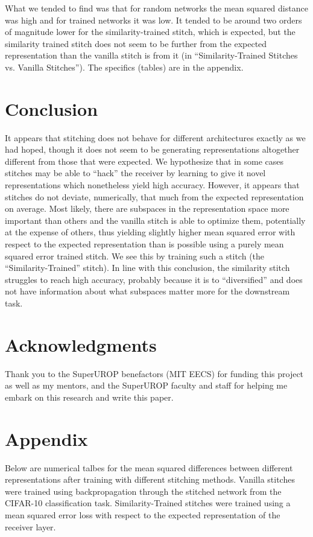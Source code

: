 \documentclass{article} %
\begin{document}
What we tended to find was that for random networks the mean squared distance was high and for trained networks it was
low. It tended to be around two orders of magnitude lower for the similarity-trained stitch, which is expected, but the
similarity trained stitch does not seem to be further from the expected representation than the vanilla stitch is from it
(in ``Similarity-Trained Stitches vs. Vanilla Stitches''). The specifics (tables) are in the appendix.
   
\section{Conclusion}
\label{Conclusion}
It appears that stitching does not behave for different architectures exactly as we had hoped, though it does not seem
to be generating representations altogether different from those that were expected. We hypothesize that in some cases
stitches may be able to ``hack'' the receiver by learning to give it novel representations which nonetheless yield high
accuracy. However, it appears that stitches do not deviate, numerically, that much from the expected representation on
average. Most likely, there are subspaces in the representation space more important than others and the vanilla stitch
is able to optimize them, potentially at the expense of others, thus yielding slightly higher mean squared error with
respect to the expected representation than is possible using a purely mean squared error trained stitch. We see this
by training such a stitch (the ``Similarity-Trained'' stitch). In line with this conclusion, the similarity stitch struggles
to reach high accuracy, probably because it is to ``diversified'' and does not have information about what subspaces
matter more for the downstream task.

\section*{Acknowledgments}
\label{Acknowledgments}
Thank you to the SuperUROP benefactors (MIT EECS) for funding this project as well as my mentors, and the
SuperUROP faculty and staff for helping me embark on this research and write this paper.
\newpage


\newpage
\appendix
\section{Appendix}
\label{Appendix}
Below are numerical talbes for the mean squared differences between different representations
after training with different stitching methods. Vanilla stitches were trained using backpropagation
through the stitched network from the CIFAR-10 classification task. Similarity-Trained stitches were
trained using a mean squared error loss with respect to the expected representation of the
receiver layer.
\end{document}

